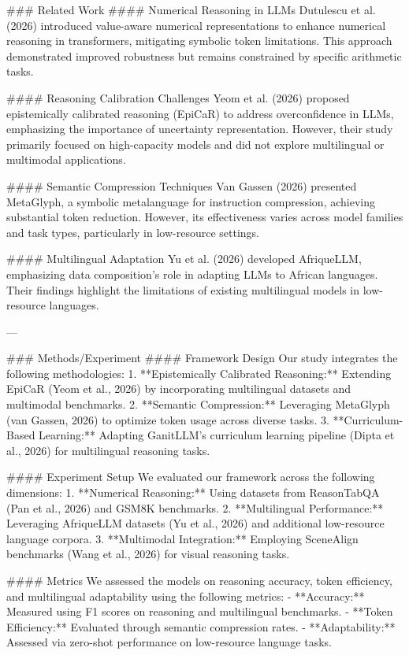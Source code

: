 ### Related Work
#### Numerical Reasoning in LLMs
Dutulescu et al. (2026) introduced value-aware numerical representations to enhance numerical reasoning in transformers, mitigating symbolic token limitations. This approach demonstrated improved robustness but remains constrained by specific arithmetic tasks.

#### Reasoning Calibration Challenges
Yeom et al. (2026) proposed epistemically calibrated reasoning (EpiCaR) to address overconfidence in LLMs, emphasizing the importance of uncertainty representation. However, their study primarily focused on high-capacity models and did not explore multilingual or multimodal applications.

#### Semantic Compression Techniques
Van Gassen (2026) presented MetaGlyph, a symbolic metalanguage for instruction compression, achieving substantial token reduction. However, its effectiveness varies across model families and task types, particularly in low-resource settings.

#### Multilingual Adaptation
Yu et al. (2026) developed AfriqueLLM, emphasizing data composition's role in adapting LLMs to African languages. Their findings highlight the limitations of existing multilingual models in low-resource languages.

---

### Methods/Experiment
#### Framework Design
Our study integrates the following methodologies:
1. **Epistemically Calibrated Reasoning:** Extending EpiCaR (Yeom et al., 2026) by incorporating multilingual datasets and multimodal benchmarks.
2. **Semantic Compression:** Leveraging MetaGlyph (van Gassen, 2026) to optimize token usage across diverse tasks.
3. **Curriculum-Based Learning:** Adapting GanitLLM's curriculum learning pipeline (Dipta et al., 2026) for multilingual reasoning tasks.

#### Experiment Setup
We evaluated our framework across the following dimensions:
1. **Numerical Reasoning:** Using datasets from ReasonTabQA (Pan et al., 2026) and GSM8K benchmarks.
2. **Multilingual Performance:** Leveraging AfriqueLLM datasets (Yu et al., 2026) and additional low-resource language corpora.
3. **Multimodal Integration:** Employing SceneAlign benchmarks (Wang et al., 2026) for visual reasoning tasks.

#### Metrics
We assessed the models on reasoning accuracy, token efficiency, and multilingual adaptability using the following metrics:
- **Accuracy:** Measured using F1 scores on reasoning and multilingual benchmarks.
- **Token Efficiency:** Evaluated through semantic compression rates.
- **Adaptability:** Assessed via zero-shot performance on low-resource language tasks.

